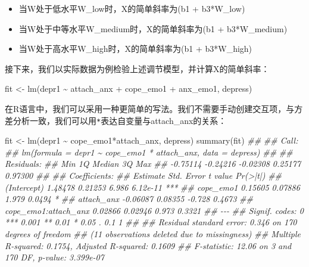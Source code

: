 \documentclass[
  chinese-hans,
  letterpaper,
  DIV=11,
  numbers=noendperiod]{scrartcl}
\newenvironment{Shaded}{\begin{snugshade}}{\end{snugshade}}
\newcommand{\DocumentationTok}[1]{\textcolor[rgb]{0.37,0.37,0.37}{\textit{#1}}}
\newcommand{\FunctionTok}[1]{\textcolor[rgb]{0.28,0.35,0.67}{#1}}
\newcommand{\NormalTok}[1]{\textcolor[rgb]{0.00,0.23,0.31}{#1}}
\newcommand{\OtherTok}[1]{\textcolor[rgb]{0.00,0.23,0.31}{#1}}
\newcommand{\SpecialCharTok}[1]{\textcolor[rgb]{0.37,0.37,0.37}{#1}}
\providecommand{\tightlist}{%
  \setlength{\itemsep}{0pt}\setlength{\parskip}{0pt}}
\begin{document}
\begin{itemize}
\tightlist
\item
  当W处于低水平W\_low时，X的简单斜率为(b1 + b3*W\_low)
\item
  当W处于中等水平W\_medium时，X的简单斜率为(b1 + b3*W\_medium)
\item
  当W处于高水平W\_high时，X的简单斜率为(b1 + b3*W\_high)
\end{itemize}

接下来，我们以实际数据为例检验上述调节模型，并计算X的简单斜率：

\begin{Shaded}
\begin{Highlighting}[numbers=left,,]
\NormalTok{fit }\OtherTok{\textless{}{-}} \FunctionTok{lm}\NormalTok{(depr1 }\SpecialCharTok{\textasciitilde{}}\NormalTok{ attach\_anx }\SpecialCharTok{+}\NormalTok{ cope\_emo1 }\SpecialCharTok{+}\NormalTok{ anx\_emo1, depress)}
\end{Highlighting}
\end{Shaded}

在R语言中，我们可以采用一种更简单的写法。我们不需要手动创建交互项，与方差分析一致，我们可以用\texttt{*}表达自变量与attach\_anx的关系：

\begin{Shaded}
\begin{Highlighting}[numbers=left,,]
\NormalTok{fit }\OtherTok{\textless{}{-}} \FunctionTok{lm}\NormalTok{(depr1 }\SpecialCharTok{\textasciitilde{}}\NormalTok{ cope\_emo1}\SpecialCharTok{*}\NormalTok{attach\_anx, depress)}
\FunctionTok{summary}\NormalTok{(fit)}
\DocumentationTok{\#\# }
\DocumentationTok{\#\# Call:}
\DocumentationTok{\#\# lm(formula = depr1 \textasciitilde{} cope\_emo1 * attach\_anx, data = depress)}
\DocumentationTok{\#\# }
\DocumentationTok{\#\# Residuals:}
\DocumentationTok{\#\#      Min       1Q   Median       3Q      Max }
\DocumentationTok{\#\# {-}0.75114 {-}0.24216 {-}0.02308  0.25177  0.97300 }
\DocumentationTok{\#\# }
\DocumentationTok{\#\# Coefficients:}
\DocumentationTok{\#\#                      Estimate Std. Error t value Pr(\textgreater{}|t|)    }
\DocumentationTok{\#\# (Intercept)           1.48478    0.21253   6.986 6.12e{-}11 ***}
\DocumentationTok{\#\# cope\_emo1             0.15605    0.07886   1.979   0.0494 *  }
\DocumentationTok{\#\# attach\_anx           {-}0.06087    0.08355  {-}0.728   0.4673    }
\DocumentationTok{\#\# cope\_emo1:attach\_anx  0.02866    0.02946   0.973   0.3321    }
\DocumentationTok{\#\# {-}{-}{-}}
\DocumentationTok{\#\# Signif. codes:  0 \textquotesingle{}***\textquotesingle{} 0.001 \textquotesingle{}**\textquotesingle{} 0.01 \textquotesingle{}*\textquotesingle{} 0.05 \textquotesingle{}.\textquotesingle{} 0.1 \textquotesingle{} \textquotesingle{} 1}
\DocumentationTok{\#\# }
\DocumentationTok{\#\# Residual standard error: 0.346 on 170 degrees of freedom}
\DocumentationTok{\#\#   (11 observations deleted due to missingness)}
\DocumentationTok{\#\# Multiple R{-}squared:  0.1754, Adjusted R{-}squared:  0.1609 }
\DocumentationTok{\#\# F{-}statistic: 12.06 on 3 and 170 DF,  p{-}value: 3.399e{-}07}
\end{Highlighting}
\end{Shaded}
\end{document}
